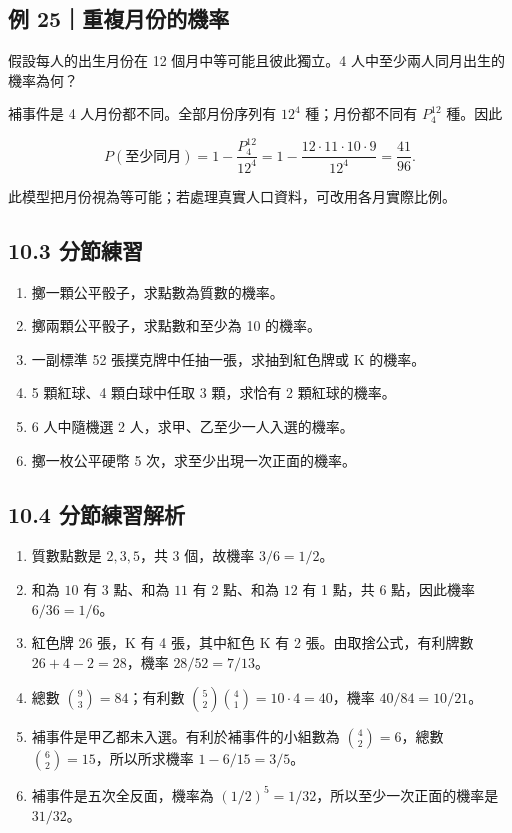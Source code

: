 \documentclass[11pt,a4paper]{article}
\providecommand{\tightlist}{%
  \setlength{\itemsep}{0pt}\setlength{\parskip}{0pt}}
\begin{document}
\subsection{例 25｜重複月份的機率}\label{ux4f8b-25ux91cdux8907ux6708ux4efdux7684ux6a5fux7387}

假設每人的出生月份在 12 個月中等可能且彼此獨立。4 人中至少兩人同月出生的機率為何？

補事件是 4 人月份都不同。全部月份序列有 \(12^4\) 種；月份都不同有 \(P^{12}_4\) 種。因此

\[
P(\text{至少同月})
=1-\frac{P^{12}_4}{12^4}
=1-\frac{12\cdot11\cdot10\cdot9}{12^4}
=\frac{41}{96}.
\]

此模型把月份視為等可能；若處理真實人口資料，可改用各月實際比例。

\subsection{10.3 分節練習}\label{ux5206ux7bc0ux7df4ux7fd2-9}

\begin{enumerate}
\def\labelenumi{\arabic{enumi}.}
\tightlist
\item
  擲一顆公平骰子，求點數為質數的機率。
\item
  擲兩顆公平骰子，求點數和至少為 10 的機率。
\item
  一副標準 52 張撲克牌中任抽一張，求抽到紅色牌或 K 的機率。
\item
  5 顆紅球、4 顆白球中任取 3 顆，求恰有 2 顆紅球的機率。
\item
  6 人中隨機選 2 人，求甲、乙至少一人入選的機率。
\item
  擲一枚公平硬幣 5 次，求至少出現一次正面的機率。
\end{enumerate}

\subsection{10.4 分節練習解析}\label{ux5206ux7bc0ux7df4ux7fd2ux89e3ux6790-9}

\begin{enumerate}
\def\labelenumi{\arabic{enumi}.}
\tightlist
\item
  質數點數是 \(2,3,5\)，共 3 個，故機率 \(3/6=1/2\)。
\item
  和為 \(10\) 有 3 點、和為 \(11\) 有 2 點、和為 \(12\) 有 1 點，共 6 點，因此機率 \(6/36=1/6\)。
\item
  紅色牌 26 張，K 有 4 張，其中紅色 K 有 2 張。由取捨公式，有利牌數 \(26+4-2=28\)，機率 \(28/52=7/13\)。
\item
  總數 \(\binom93=84\)；有利數 \(\binom52\binom41=10\cdot4=40\)，機率 \(40/84=10/21\)。
\item
  補事件是甲乙都未入選。有利於補事件的小組數為 \(\binom42=6\)，總數 \(\binom62=15\)，所以所求機率 \(1-6/15=3/5\)。
\item
  補事件是五次全反面，機率為 \((1/2)^5=1/32\)，所以至少一次正面的機率是 \(31/32\)。
\end{enumerate}
\end{document}
